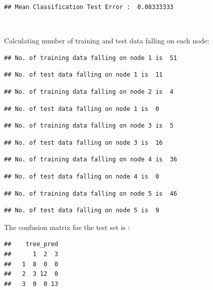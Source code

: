 \documentclass[]{article}
\begin{document}
\begin{verbatim}
## Mean Classification Test Error :  0.08333333
\end{verbatim}

~

Calculating number of training and test data falling on each node:

\begin{verbatim}
## No. of training data falling on node 1 is  51
\end{verbatim}

\begin{verbatim}
## No. of test data falling on node 1 is  11
\end{verbatim}

\begin{verbatim}
## No. of training data falling on node 2 is  4
\end{verbatim}

\begin{verbatim}
## No. of test data falling on node 1 is  0
\end{verbatim}

\begin{verbatim}
## No. of training data falling on node 3 is  5
\end{verbatim}

\begin{verbatim}
## No. of test data falling on node 3 is  16
\end{verbatim}

\begin{verbatim}
## No. of training data falling on node 4 is  36
\end{verbatim}

\begin{verbatim}
## No. of test data falling on node 4 is  0
\end{verbatim}

\begin{verbatim}
## No. of training data falling on node 5 is  46
\end{verbatim}

\begin{verbatim}
## No. of test data falling on node 5 is  9
\end{verbatim}

\newpage

The confusion matrix foe the test set is :

\begin{verbatim}
##    tree_pred
##      1  2  3
##   1  8  0  0
##   2  3 12  0
##   3  0  0 13
\end{verbatim}
\end{document}
